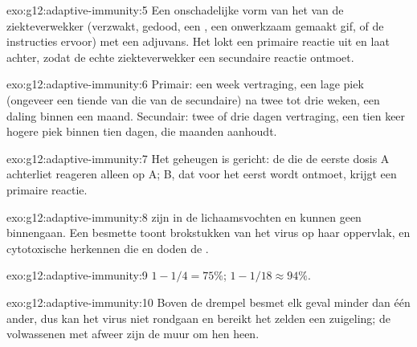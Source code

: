 \begin{solution}{exo:g12:adaptive-immunity:5}
Een onschadelijke vorm van het  van de ziekteverwekker (verzwakt,
gedood, een , een onwerkzaam gemaakt gif, of de instructies ervoor)
met een adjuvans. Het lokt een primaire reactie uit en laat 
achter, zodat de echte ziekteverwekker een secundaire reactie ontmoet.
\end{solution}

\begin{solution}{exo:g12:adaptive-immunity:6}
Primair: een week vertraging, een lage piek (ongeveer een tiende van die
van de secundaire) na twee tot drie weken, een daling binnen een maand.
Secundair: twee of drie dagen vertraging, een tien keer hogere piek binnen
tien dagen, die maanden aanhoudt.
\end{solution}

\begin{solution}{exo:g12:adaptive-immunity:7}
Het geheugen is gericht: de  die de eerste dosis A achterliet
reageren alleen op A; B, dat voor het eerst wordt ontmoet, krijgt een
primaire reactie.
\end{solution}

\begin{solution}{exo:g12:adaptive-immunity:8}
 zijn  in de lichaamsvochten en kunnen geen 
binnengaan. Een besmette  toont brokstukken van het virus op haar
oppervlak, en cytotoxische  herkennen die en doden de .
\end{solution}

\begin{solution}{exo:g12:adaptive-immunity:9}
$1 - 1/4 = 75\%$; $1 - 1/18 \approx 94\%$.
\end{solution}

\begin{solution}{exo:g12:adaptive-immunity:10}
Boven de drempel besmet elk geval minder dan één ander, dus kan het virus
niet rondgaan en bereikt het zelden een zuigeling; de volwassenen met
afweer zijn de muur om hen heen.
\end{solution}

